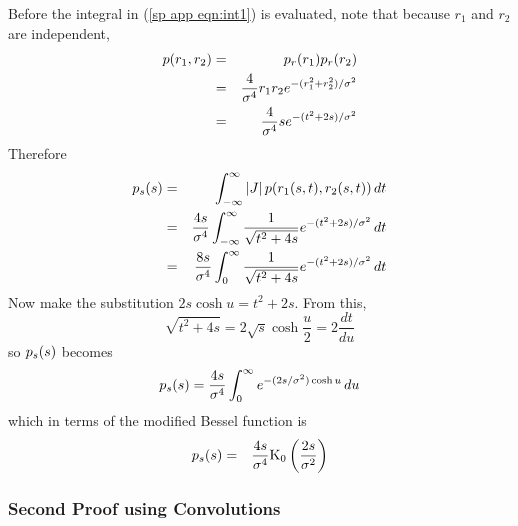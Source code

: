 Before the integral in (\ref{sp app eqn:int1}) is evaluated, note
that because $r_1$ and $r_2$ are independent,
\begin{eqnarray}
{p}(r_1,r_2)&=&{p}_r(r_1){p}_r(r_2){\nonumber}\\
&=&\frac{4}{{\sigma^{4}}}r_1r_2{e^{-(r_1^2+r_2^2)/{\sigma^2}}}{\nonumber}\\
&=&\frac{4}{{\sigma^{4}}}s{e^{-(t^2+2s)/{\sigma^2}}}
\end{eqnarray}
Therefore
\begin{eqnarray}
{p}_s(s)&=&\int_{-\infty}^{\infty} |J|\,{p}(r_1(s,t),r_2(s,t))\,dt{\nonumber}\\
&=&\frac{4s}{{\sigma^{4}}}\int_{-\infty}^{\infty}\frac{1}{\sqrt{t^2+4s}}
{e^{-(t^2+2s)/{\sigma^2}}} \,dt{\nonumber}\\
&=&\frac{8s}{{\sigma^{4}}}\int_0^{\infty}\frac{1}{\sqrt{t^2+4s}}
{e^{-(t^2+2s)/{\sigma^2}}} \,dt
\end{eqnarray}
Now make the substitution $2s\cosh u=t^2+2s$.  From this,
\begin{equation}
\sqrt{t^2+4s}=2\sqrt{s}\cosh \frac{u}{2}=2\frac{dt}{du}
\end{equation}
so ${p}_s(s)$ becomes
\begin{equation}\label{sp app eqn:pr(s) 1st}
{p}_s(s)=\frac{4s}{{\sigma^{4}}}\int_0^{\infty}{e^{-(2s/{\sigma^2})\cosh u}} \,du
\end{equation}
which in terms of the modified Bessel function is
\begin{eqnarray}
{p}_s(s)&=&\frac{4s}{{\sigma^{4}}}{\mathop{\rm K_0}\nolimits\left(\frac{2s}{{\sigma^2}}\right)}
\end{eqnarray}


\subsubsection{Second Proof using Convolutions}

